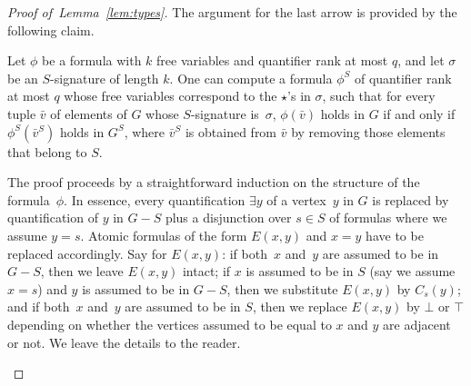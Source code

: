 \begin{proof}[Proof of~Lemma~\ref{lem:types}]
\medskip

The argument for the last arrow is provided by the following claim.

\begin{claim}\label{cl:rewrite}
  Let $\phi$ be a formula
  with $k$ free variables and quantifier rank at most $q$, 
  and let $\sigma$ be an $S$-signature of length $k$.
  One can compute a formula $\phi^S$ of quantifier rank at most $q$
  whose free variables correspond to the $\star$'s in $\sigma$,
  such that for every tuple $\bar v$ of elements of $G$
  whose $S$-signature is~$\sigma$,
   $\phi(\bar v)$ holds in $G$
  if and only if $\phi^S(\bar v^S)$ holds in $G^S$, where $\bar v^S$ is obtained from $\bar v$ by removing 
  those elements that belong to $S$.
\end{claim}
\begin{clproof}[Sketch]
The proof proceeds by a straightforward induction on the structure of the formula~$\phi$.
In essence, every quantification $\exists y$ of a vertex~$y$ in $G$ is replaced by quantification of $y$ in $G-S$ plus a disjunction over $s\in S$ of formulas where we assume $y=s$.
Atomic formulas of the form $E(x,y)$ and $x=y$ have to be replaced accordingly. Say for $E(x,y)$: if both~$x$ and~$y$ are assumed to be in $G-S$, then we leave $E(x,y)$ intact;
if $x$ is assumed to be in $S$ (say we assume $x=s$) and $y$ is assumed to be in $G-S$, then we substitute $E(x,y)$ by $C_s(y)$; and if both~$x$ and~$y$ are assumed to be in $S$, then 
we replace $E(x,y)$ by $\bot$ or $\top$ depending on whether the vertices assumed to be equal to $x$ and $y$ are adjacent or not.
We leave the details to the reader.
\end{clproof}
\begin{comment}
\begin{clproof}
The proof proceeds by induction on the structure of the formula $\phi$. 

If $\phi$ is an atomic formula $E(x,x')$ or $x=x'$, then the formula $\phi^S$ is constructed by case analysis. If $\alpha(x),\alpha(x')\in Y$ then $\phi^S$
is obtained from $\phi$ by substituting the variables $x,x'$ with variables from $Y$ according to~$\alpha$. If  $\alpha(x),\alpha(x')\in S$ then $\phi'$ is the truth value $\bot$ or $\top$ of 
the formula $\phi$ in the graph $G$ under the valuation which maps $x$ to $\alpha(x)$ and $x'$ to $\alpha(x')$. 
Finally, suppose that $\alpha(x)=y\in Y$ and $\alpha(x')=s\in S$. If $\phi$ is $E(x,x')$ then $\phi'$ is the formula $C_{s}(y)$, and if $\phi$ is $x=x'$ then $\phi'$ is the formula $\bot$.
 

\end{comment}
\end{proof}
